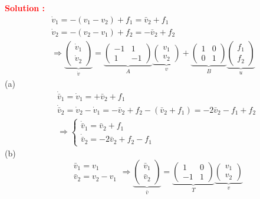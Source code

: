 \documentclass[12pt]{article}
\begin{document}
\textbf{\textcolor{red}{Solution :}} \\
$$
\begin{aligned}
\dot{v}_1=-\left(v_1-v_2\right)+f_1=\bar{v}_2+f_1 \\
\dot{v}_2=-\left(v_2-v_1\right)+f_2=-\bar{v}_2+f_2 \\
\Longrightarrow \underbrace{\left(\begin{array}{c}
\dot{v}_1 \\
\dot{v}_2
\end{array}\right)}_{\dot{v}}=\underbrace{\left(\begin{array}{cc}
-1 & 1 \\
1 & -1
\end{array}\right)}_A \underbrace{\left(\begin{array}{l}
v_1 \\
v_2
\end{array}\right)}_v+\underbrace{\left(\begin{array}{cc}
1 & 0 \\
0 & 1
\end{array}\right)}_B \underbrace{\left(\begin{array}{l}
f_1 \\
f_2
\end{array}\right)}_u
\end{aligned}
$$
(a)
$$
\begin{aligned}
& \dot{\bar{v}}_1=\dot{v}_1=+\bar{v}_2+f_1 \\
& \dot{\bar{v}}_2=\dot{v}_2-\dot{v}_1=-\bar{v}_2+f_2-\left(\bar{v}_2+f_1\right)=-2 \bar{v}_2-f_1+f_2 \\
& \Longrightarrow\left\{\begin{array}{l}
\dot{\bar{v}}_1=\bar{v}_2+f_1 \\
\dot{\bar{v}}_2=-2 \bar{v}_2+f_2-f_1
\end{array}\right.
\end{aligned}
$$
(b)
$$
\begin{aligned}
& \bar{v}_1=v_1 \\
& \bar{v}_2=v_2-v_1
\end{aligned} \Longrightarrow \underbrace{\left(\begin{array}{l}
\bar{v}_1 \\
\bar{v}_2
\end{array}\right)}_{\bar{v}}=\underbrace{\left(\begin{array}{cc}
1 & 0 \\
-1 & 1
\end{array}\right)}_T \underbrace{\left(\begin{array}{l}
v_1 \\
v_2
\end{array}\right)}_v
$$
\end{document}
